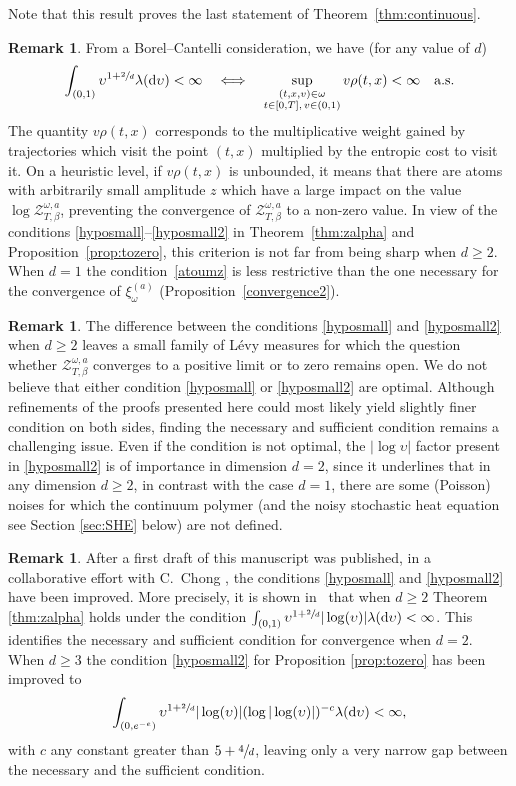 \documentclass[10pt]{amsart}
\let\mathcal\mathscr
\theoremstyle{definition}
\newtheorem{rem}[theorem]{Remark}
\newcommand{\dd}{\mathrm{d}}
\newcommand{\cZ}{{\ensuremath{\mathcal Z}} }
\newcommand{\suptwo}[2]{\sup_{\substack{#1 \\ #2}}}
\let\gl\lambda
\let\ups\upsilon
\let\go\omega
\begin{document}
Note that this result proves the last statement of Theorem~\ref{thm:continuous}.

\begin{rem}
From a Borel--Cantelli consideration, we have (for any value of $d$)
\begin{equation}\label{atoumz}
\int_{(0,1)} \ups^{1+\sfrac{2}{d}} \gl(\dd \ups)<\infty \quad \Longleftrightarrow \quad
\suptwo{(t,x,v)\in \go}{ t\in [0,T],\, v\in(0,1)} v\rho(t,x)<\infty \quad \text{a.s.}
\end{equation}
The quantity $v\rho(t,x)$ corresponds to the multiplicative weight gained by trajectories which visit the point
$(t,x)$ multiplied by the entropic cost to visit it.
On a heuristic level, if $v\rho(t,x)$ is unbounded, it means that there are atoms with arbitrarily small amplitude $z$ which have a large impact on the value $\log \cZ^{\go,a}_{T,\beta}$, preventing the convergence of $\cZ^{\go,a}_{T,\beta}$ to a non-zero value.
In view of the conditions \eqref{hyposmall}--\eqref{hyposmall2} in
Theorem~\ref{thm:zalpha} and Proposition~\ref{prop:tozero}, this criterion is not far from being sharp when $d\ge 2$.
When $d=1$ the condition~\eqref{atoumz} is less restrictive than the one necessary for the convergence of $\xi^{(a)}_{\go}$ (\cf Proposition~\ref{convergence2}).
\end{rem}

\begin{rem}
The difference between the conditions \eqref{hyposmall} and \eqref{hyposmall2} when $d\ge 2$ leaves a small family of Lévy measures for which the question whether $\cZ^{\go,a}_{T,\beta}$ converges to a positive limit or to zero remains open. We do not believe that either condition \eqref{hyposmall} or \eqref{hyposmall2} are optimal. Although refinements of the proofs presented here could most likely yield slightly finer condition on both sides, finding the necessary and sufficient condition remains a challenging issue.
Even if the condition is not optimal, the $|\log \ups|$ factor present in \eqref{hyposmall2}
is of importance in dimension $d=2$, since it underlines that in any dimension $d\geq 2$, in contrast with the case $d=1$, there are some (Poisson) noises for which the continuum polymer (and the noisy stochastic heat equation see Section \ref{sec:SHE} below) are not defined.
\end{rem}

\begin{rem}
After a first draft of this manuscript was published, in a collaborative effort with C.\ Chong \cite{BCL21}, the conditions \eqref{hyposmall} and
\eqref{hyposmall2} have been improved. More precisely,
it is shown in~\cite{BCL21} that when $d\ge 2$
Theorem \ref{thm:zalpha} holds under the condition
$\int_{(0,1)} \ups^{1+\sfrac{2}{d}}|\log (\ups)| \gl(\dd \ups)<\infty$.
This identifies the necessary and sufficient condition for convergence when $d=2$. When $d\ge 3$ the condition \eqref{hyposmall2} for Proposition \ref{prop:tozero} has been improved to
\[
\int_{(0,e^{-e})} \ups^{1+\sfrac{2}{d}}|\log (\ups)| (\log |\log (\ups)|)^{-c}\gl(\dd \ups)<\infty,
\]
with $c$ any constant greater than $5+\sfrac4d$,
leaving only a very narrow gap between the necessary and the sufficient condition.
\end{rem}
\end{document}
